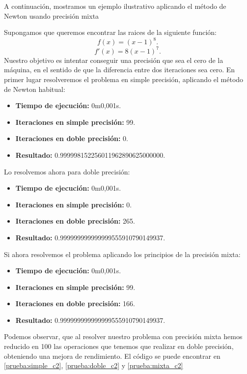 A continuación, mostramos un ejemplo ilustrativo aplicando el método de Newton usando precisión mixta
\begin{ejemplo}
  Supongamos que queremos encontrar las raices de la siguiente función:
  \[
  f(x) = (x-1)^8.
  \]
  \[
  f'(x) = 8 (x-1)^7.
  \]
  Nuestro objetivo es intentar conseguir una precisión que sea el cero de la máquina, en el sentido de que la diferencia entre dos iteraciones sea cero. En primer lugar resolveremos el problema en simple precisión, aplicando el método de Newton habitual:
  \begin{itemize}
  \item \textbf{Tiempo de ejecución: } 0m0,001s.
  \item \textbf{Iteraciones en simple precisión: } 99.
  \item \textbf{Iteraciones en doble precisión: } 0.
  \item \textbf{Resultado: } 0.999998152256011962890625000000.
  \end{itemize}

  Lo resolvemos ahora para doble precisión:
  \begin{itemize}
  \item \textbf{Tiempo de ejecución: } 0m0,001s.
  \item \textbf{Iteraciones en simple precisión: } 0.
  \item \textbf{Iteraciones en doble precisión: } 265.
  \item \textbf{Resultado: } 0.999999999999999555910790149937.
  \end{itemize}

  Si ahora resolvemos el problema aplicando los principios de la precisión mixta:
  \begin{itemize}
  \item \textbf{Tiempo de ejecución: } 0m0,001s.
  \item \textbf{Iteraciones en simple precisión: } 99.
  \item \textbf{Iteraciones en doble precisión: } 166.
  \item \textbf{Resultado: } 0.999999999999999555910790149937.
  \end{itemize}

  Podemos observar, que al resolver nuestro problema con precisión mixta hemos reducido en 100 las operaciones que tenemos que realizar en doble precisión, obteniendo una mejora de rendimiento. El código se puede encontrar en \ref{prueba:simple_c2}, \ref{prueba:doble_c2} y \ref{prueba:mixta_c2}
\end{ejemplo}

